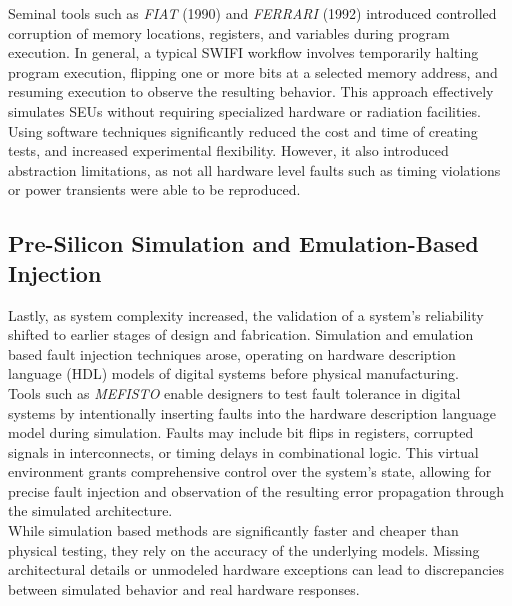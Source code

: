 Seminal tools such as \textit{FIAT} (1990) \cite{FIAT} and \textit{FERRARI} (1992) \cite{FERRARI} introduced controlled corruption of memory locations, registers, and variables during program execution. In general, a typical SWIFI workflow involves temporarily halting program execution, flipping one or more bits at a selected memory address, and resuming execution to observe the resulting behavior. This approach effectively simulates SEUs without requiring specialized hardware or radiation facilities.\\

Using software techniques significantly reduced the cost and time of creating tests, and increased experimental flexibility. However, it also introduced abstraction limitations, as not all hardware level faults such as timing violations or power transients were able to be reproduced.

\subsection{Pre-Silicon Simulation and Emulation-Based Injection}
Lastly, as system complexity increased, the validation of a system's reliability shifted to earlier stages of design and fabrication. Simulation and emulation based fault injection techniques arose, operating on hardware description language (HDL) models of digital systems before physical manufacturing.\\

Tools such as \textit{MEFISTO} \cite{MEFISTO} enable designers to test fault tolerance in digital systems by intentionally inserting faults into the hardware description language model during simulation. Faults may include bit flips in registers, corrupted signals in interconnects, or timing delays in combinational logic. This virtual environment grants comprehensive control over the system's state, allowing for precise fault injection and observation of the resulting error propagation through the simulated architecture.\\

While simulation based methods are significantly faster and cheaper than physical testing, they rely on the accuracy of the underlying models. Missing architectural details or unmodeled hardware exceptions can lead to discrepancies between simulated behavior and real hardware responses.